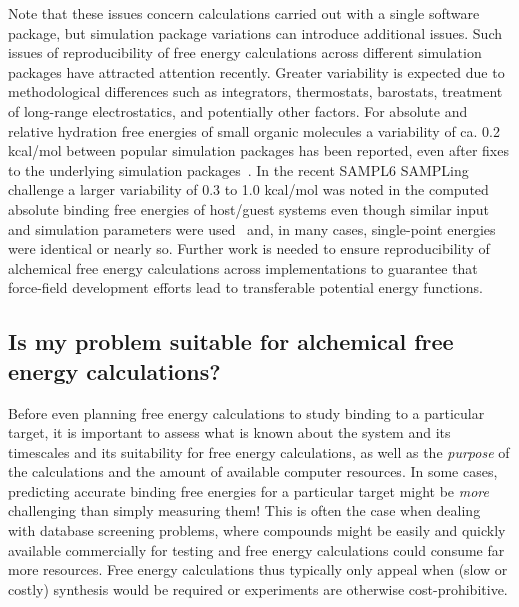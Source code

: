 \documentclass[9pt,bestpractices]{livecoms}
\begin{document}
Note that these issues concern calculations carried out with a single software package, but simulation package variations can introduce additional issues. Such issues of reproducibility of free energy calculations across different simulation packages have attracted attention recently. Greater variability is expected due to methodological differences such as integrators, thermostats, barostats, treatment of long-range electrostatics, and potentially other factors. For absolute and relative hydration free energies of small organic molecules a variability of ca. 0.2 kcal/mol between popular simulation packages has been reported, even after fixes to the underlying simulation packages~\cite{loeffler2018reproducibility}. In the recent SAMPL6 SAMPLing challenge a larger variability of 0.3 to 1.0 kcal/mol was noted in the computed absolute binding free energies of host/guest systems even though similar input and simulation parameters were used~\cite{rizzi2019sampl6} and, in many cases, single-point energies were identical or nearly so. Further work is needed to ensure reproducibility of alchemical free energy calculations across implementations to guarantee that force-field development efforts lead to transferable potential energy functions. 

\subsection{Is my problem suitable for alchemical free energy calculations?}
\label{subsec:suitability}
Before even planning free energy calculations to study binding to a
particular target, it is important to assess what is known about the
system and its timescales and its suitability for free energy
calculations, as well as the \emph{purpose} of the calculations and
the amount of available computer resources. In some cases, predicting accurate binding free energies for a particular target might be
\emph{more} challenging than simply measuring them! This is
often the case when dealing with database screening problems, where
compounds might be easily and quickly available commercially for
testing and free energy calculations could consume far more resources. Free energy calculations thus typically only
appeal when (slow or costly) synthesis would be required or experiments are otherwise cost-prohibitive.
\end{document}
